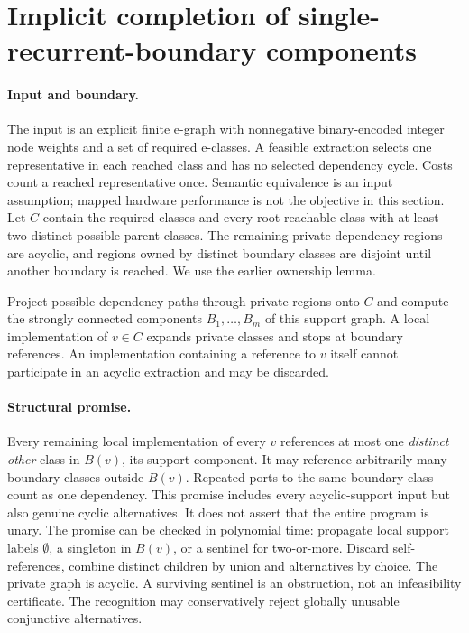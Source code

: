 \section{Implicit completion of single-recurrent-boundary components}

\paragraph{Input and boundary.}
The input is an explicit finite e-graph with nonnegative binary-encoded integer
node weights and a set of required e-classes. A feasible extraction selects one
representative in each reached class and has no selected dependency cycle.
Costs count a reached representative once. Semantic equivalence is an input
assumption; mapped hardware performance is not the objective in this section.
Let $C$ contain the required classes and every root-reachable class with at
least two distinct possible parent classes. The remaining private dependency
regions are acyclic, and regions owned by distinct boundary classes are disjoint
until another boundary is reached. We use the earlier ownership lemma.

Project possible dependency paths through private regions onto $C$ and compute
the strongly connected components $B_1,\ldots,B_m$ of this support graph.
A local implementation of $v\in C$ expands private classes and stops at boundary
references. An implementation containing a reference to $v$ itself cannot
participate in an acyclic extraction and may be discarded.

\paragraph{Structural promise.}
Every remaining local implementation of every $v$ references at most one
\emph{distinct other} class in $B(v)$, its support component. It may reference
arbitrarily many boundary classes outside $B(v)$. Repeated ports to the same
boundary class count as one dependency. This promise includes every
acyclic-support input but also genuine cyclic alternatives. It does not assert
that the entire program is unary. The promise can be checked in polynomial time:
propagate local support labels $\emptyset$, a singleton in $B(v)$, or a sentinel
for two-or-more. Discard self-references, combine distinct children by union and
alternatives by choice. The private graph is acyclic. A surviving sentinel is
an obstruction, not an infeasibility certificate. The recognition may conservatively
reject globally unusable conjunctive alternatives.

